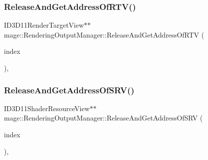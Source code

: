 \subsubsection{\texorpdfstring{Release\+And\+Get\+Address\+Of\+R\+T\+V()}{ReleaseAndGetAddressOfRTV()}}
{\footnotesize\ttfamily I\+D3\+D11\+Render\+Target\+View$\ast$$\ast$ mage\+::\+Rendering\+Output\+Manager\+::\+Release\+And\+Get\+Address\+Of\+R\+TV (\begin{DoxyParamCaption}\item[{\hyperlink{classmage_1_1_rendering_output_manager_aebe136819797593f0fcf53b753e9c3ce}{R\+T\+V\+Index}}]{index }\end{DoxyParamCaption})\hspace{0.3cm}{\ttfamily [private]}, {\ttfamily [noexcept]}}

\hypertarget{classmage_1_1_rendering_output_manager_ab6b8045718c2dbfc8b64c23d220a2288}{}\label{classmage_1_1_rendering_output_manager_ab6b8045718c2dbfc8b64c23d220a2288} 
\subsubsection{\texorpdfstring{Release\+And\+Get\+Address\+Of\+S\+R\+V()}{ReleaseAndGetAddressOfSRV()}}
{\footnotesize\ttfamily I\+D3\+D11\+Shader\+Resource\+View$\ast$$\ast$ mage\+::\+Rendering\+Output\+Manager\+::\+Release\+And\+Get\+Address\+Of\+S\+RV (\begin{DoxyParamCaption}\item[{\hyperlink{classmage_1_1_rendering_output_manager_a25aa12ba77bb160c5641cf54f7a68a29}{S\+R\+V\+Index}}]{index }\end{DoxyParamCaption})\hspace{0.3cm}{\ttfamily [private]}, {\ttfamily [noexcept]}}

\hypertarget{classmage_1_1_rendering_output_manager_acd5d6a8feb5a7d9aa41667be0cef617b}{}\label{classmage_1_1_rendering_output_manager_acd5d6a8feb5a7d9aa41667be0cef617b} 
